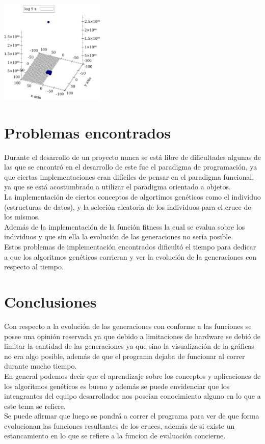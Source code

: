 \documentclass[10pt,a4paper]{article}
\begin{document}
\begin{center}
\begin{center}
\end{center}
\begin{center}
\includegraphics[width=5cm, height=5cm]{1}
\end{center}
\end{center}
\pagebreak
\section{Problemas encontrados}
Durante el desarrollo de un proyecto nunca se está libre de dificultades algunas de las que se encontró en el desarrollo de este fue el paradigma de programación, ya que ciertas implementaciones eran difíciles de pensar en el paradigma funcional, ya que se está acostumbrado a utilizar el paradigma orientado a objetos. \\
La implementación de ciertos conceptos de algortimos genéticos
como el individuo (estructuras de datos), y la seleción aleatoria de los individuos para el cruce de los mismos.\\
Además de la implementación de la función fitness la cual se evalua sobre los individuos y que sin ella la evolución de las generaciones no sería posible.\\
Estos problemas de implementación encontrados dificultó el tiempo para dedicar a que los algoritmos genéticos corrieran y ver la evolución de la generaciones con respecto al tiempo.\\
\section{Conclusiones}
	Con respecto a la evolución de las generaciones con conforme a las funciones se posee una opinión reservada ya que debido a limitaciones de hardware se debió de limitar la cantidad de las generaciones ya que sino la visualización de la gráficas no era algo posible, además de que el programa dejaba de funcionar al correr durante mucho tiempo.\\
	En general podemos decir que el aprendizaje sobre los conceptos y aplicaciones de los algoritmos genéticos es bueno y además se puede envidenciar que los intengrantes del equipo desarrollador nos poseían conocimiento alguno en lo que a este tema se refiere.\\
	Se puede afirmar que luego se pondrá a correr el programa para ver de que forma evolucionan las funciones resultantes de los cruces, además de si existe un estancamiento en lo que se refiere a la funcion de evaluación concierne.\\
\end{document}
